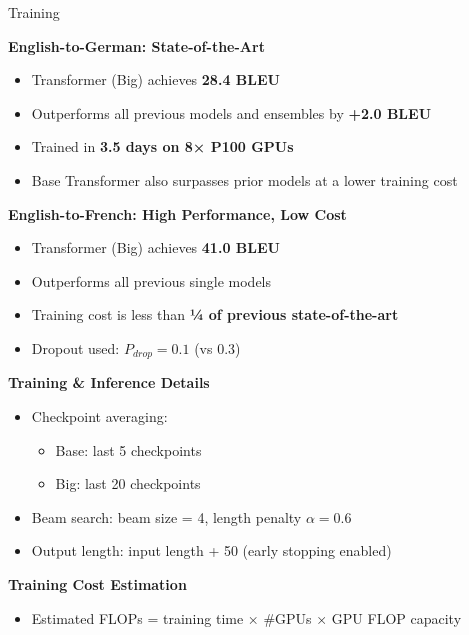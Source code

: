 \documentclass{beamer}
\begin{document}
\begin{frame}{Training}

\textbf{English-to-German: State-of-the-Art}
\begin{itemize}
  \item Transformer (Big) achieves \textbf{28.4 BLEU}
  \item Outperforms all previous models and ensembles by \textbf{+2.0 BLEU}
  \item Trained in \textbf{3.5 days on 8× P100 GPUs}
  \item Base Transformer also surpasses prior models at a lower training cost
\end{itemize}

\textbf{English-to-French: High Performance, Low Cost}
\begin{itemize}
  \item Transformer (Big) achieves \textbf{41.0 BLEU}
  \item Outperforms all previous single models
  \item Training cost is less than \textbf{¼ of previous state-of-the-art}
  \item Dropout used: $P_{drop} = 0.1$ (vs 0.3)
\end{itemize}

\textbf{Training \& Inference Details}
\begin{itemize}
  \item Checkpoint averaging:
    \begin{itemize}
      \item Base: last 5 checkpoints
      \item Big: last 20 checkpoints
    \end{itemize}
  \item Beam search: beam size = 4, length penalty $\alpha = 0.6$
  \item Output length: input length + 50 (early stopping enabled)
\end{itemize}

\textbf{Training Cost Estimation}
\begin{itemize}
  \item Estimated FLOPs = training time × \#GPUs × GPU FLOP capacity
\end{itemize}
    
\end{frame}
\end{document}
